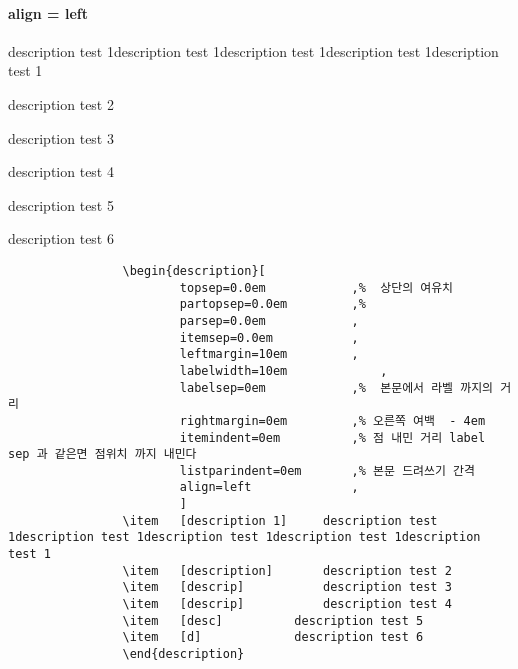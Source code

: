 \documentclass[12pt, a4paper, oneside]{book}
\begin{document}
			\paragraph{ align = left }
				\begin{description}[
						topsep=0.0em 			,%
						partopsep=0.0em 		,%
						parsep=0.0em 			, 
						itemsep=0.0em 			, 
						leftmargin=10em 		,
						labelwidth=10em 			, 
						labelsep=0em 			,%
						rightmargin=0em 		,%
						itemindent=0em 			,%
						listparindent=0em 		,%
						align=left				,
						]
				\item	[description 1]		description test 1description test 1description test 1description test 1description test 1
				\item	[description]		description test 2
				\item	[descrip]			description test 3
				\item	[descrip]			description test 4
				\item	[desc]			description test 5
				\item	[d]				description test 6
				\end{description}
	
		\begin{mdframed}[style=code_document, frametitle={code}]
			\begin{verbatim}
				\begin{description}[
						topsep=0.0em 			,%  상단의 여유치
						partopsep=0.0em 		,%  
						parsep=0.0em 			, 
						itemsep=0.0em 			, 
						leftmargin=10em 		,
						labelwidth=10em 			, 
						labelsep=0em 			,%  본문에서 라벨 까지의 거리
						rightmargin=0em 		,% 오른쪽 여백  - 4em
						itemindent=0em 			,% 점 내민 거리 label sep 과 같은면 점위치 까지 내민다
						listparindent=0em 		,% 본문 드려쓰기 간격
						align=left				,
						]
				\item	[description 1]		description test 1description test 1description test 1description test 1description test 1
				\item	[description]		description test 2
				\item	[descrip]			description test 3
				\item	[descrip]			description test 4
				\item	[desc]			description test 5
				\item	[d]				description test 6
				\end{description}
			\end{verbatim}
		\end{mdframed}
\end{document}
